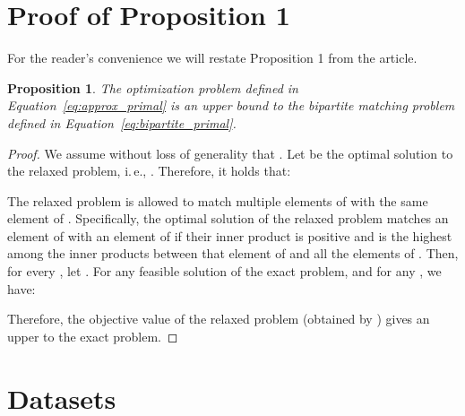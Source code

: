 \documentclass[twoside]{article}
\newcommand{\ie}{i.\,e., }
\newtheorem{proposition}{Proposition}
\begin{document}
\section{Proof of Proposition 1}\label{sec:proof_proposition}
For the reader's convenience we will restate Proposition 1 from the article.
\begin{proposition}
    The optimization problem defined in Equation~\ref{eq:approx_primal} is an upper bound to the bipartite matching problem defined in Equation~\ref{eq:bipartite_primal}.
\end{proposition}
\begin{proof}
We assume without loss of generality that .
Let  be the optimal solution to the relaxed problem, \ie .
Therefore, it holds that:

The relaxed problem is allowed to match multiple elements of  with the same element of .
Specifically, the optimal solution of the relaxed problem matches an element of  with an element of  if their inner product is positive and is the highest among the inner products between that element of  and all the elements of .
Then, for every , let .
For any feasible solution  of the exact problem, and for any , we have:

Therefore, the objective value of the relaxed problem (obtained by ) gives an upper to the exact problem.
\end{proof}

\section{Datasets}\label{sec:datasets}
\end{document}

